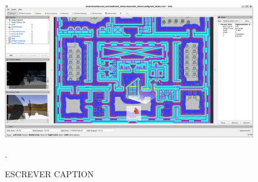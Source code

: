 \documentclass[repeatfields,xlists,xpacks,oneside,yearsonly]{ufrgscca}
\begin{document}
\begin{figure}[h]
    {
        \centering
        \caption{ESCREVER CAPTION}
        \label{fig:}
        \includegraphics[width=0.98\textwidth]{base_bag_rviz_full.png}\\
    }
    {.}
\end{figure}
\end{document}
